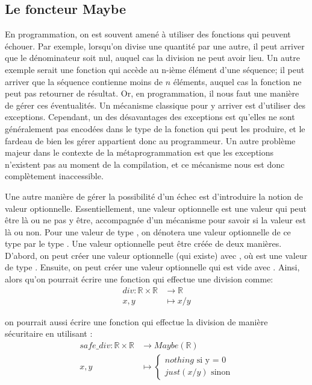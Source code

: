 \subsection{Le foncteur Maybe}
En programmation, on est souvent amené à utiliser des fonctions qui peuvent
échouer. Par exemple, lorsqu'on divise une quantité par une autre, il peut
arriver que le dénominateur soit nul, auquel cas la division ne peut avoir
lieu. Un autre exemple serait une fonction qui accède au n-ième élément
d'une séquence; il peut arriver que la séquence contienne moins de $n$
éléments, auquel cas la fonction ne peut pas retourner de résultat. Or,
en programmation, il nous faut une manière de gérer ces éventualités. Un
mécanisme classique pour y arriver est d'utiliser des exceptions. Cependant,
un des désavantages des exceptions est qu'elles ne sont généralement pas
encodées dans le type de la fonction qui peut les produire, et le fardeau
de bien les gérer appartient donc au programmeur. Un autre problème majeur
dans le contexte de la métaprogrammation est que les exceptions n'existent
pas au moment de la compilation, et ce mécanisme nous est donc complètement
inaccessible.

Une autre manière de gérer la possibilité d'un échec est d'introduire la
notion de valeur optionnelle. Essentiellement, une valeur optionnelle est
une valeur qui peut être là ou ne pas y être, accompagnée d'un mécanisme
pour savoir si la valeur est là ou non. Pour une valeur de type ,
on dénotera une valeur optionnelle de ce type par le type .
Une valeur optionnelle peut être créée de deux manières. D'abord, on peut
créer une valeur optionnelle (qui existe) avec , où 
est une valeur de type . Ensuite, on peut créer une valeur optionnelle
qui est vide avec . Ainsi, alors qu'on pourrait écrire une
fonction qui effectue une division comme:
\begin{align*}
    div : \mathbb{R} \times \mathbb{R} &\to \mathbb{R} \\
           x, y &\mapsto x / y
\end{align*}

on pourrait aussi écrire une fonction qui effectue la division de manière
sécuritaire en utilisant :
\begin{align*}
    safe\_div : \mathbb{R} \times \mathbb{R} &\to Maybe(\mathbb{R}) \\
                 x, y &\mapsto  \begin{cases}
                                    nothing \text{ si y = 0} \\
                                    just(x / y) \text{ sinon}
                                \end{cases}
\end{align*}

